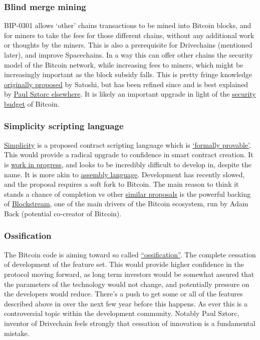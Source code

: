 \subsubsection{Blind merge mining}
BIP-0301 allows `other' chains transactions to be mined into Bitcoin blocks, and for miners to take the fees for those different chains, without any additional work or thoughts by the miners. This is also a prerequisite for Drivechains (mentioned later), and improve Spacechains. In a way this can offer other chains the security model of the Bitcoin network, while increasing fees to miners, which might be increasingly important as the block subsidy falls. This is pretty fringe knowledge \href{https://bitcointalk.org/index.php?topic=1790.msg28696#msg28696}{originally proposed} by Satoshi, but has been refined since and is best explained by \href{https://www.youtube.com/watch?v=xweFaw69EyA}{Paul Sztorc elsewhere}. It is likely an important upgrade in light of the \href{https://www.truthcoin.info/blog/security-budget/}{security budget} of Bitcoin.
\subsubsection{Simplicity scripting language}
\href{https://blockstream.com/simplicity.pdf}{Simplicity} is a proposed contract scripting language which is \href{https://coq.inria.fr/}{`formally provable'}. This would provide a radical upgrade to confidence in smart contract creation. It is \href{https://github.com/ElementsProject/simplicity/blob/pdf/Simplicity-TR.pdf}{work in progress}, and looks to be incredibly difficult to develop in, despite the name. It is more akin to \href{https://en.wikipedia.org/wiki/Assembly_language}{assembly language}. Development has recently slowed, and the proposal requires a soft fork to Bitcoin. The main reason to think it stands a chance of completion vs other \href{https://lists.linuxfoundation.org/pipermail/bitcoin-dev/2022-March/020036.html}{similar proposals} is the powerful backing of \href{https://blockstream.com/}{Blockstream}, one of the main drivers of the Bitcoin ecosystem, run by Adam Back (potential co-creator of Bitcoin). 
\subsubsection{Ossification}
The Bitcoin code is aiming toward so called \href{https://en.wikipedia.org/wiki/Protocol_ossification}{``ossification''}. The complete cessation of development of the feature set. This would provide higher confidence in the protocol moving forward, as long term investors would be somewhat assured that the parameters of the technology would not change, and potentially pressure on the developers would reduce. There's a push to get some or all of the features described above in over the next few year before this happens. As ever this is a controversial topic within the development community. Notably Paul Sztorc, inventor of Drivechain feels strongly that cessation of innovation is a fundamental mistake.
